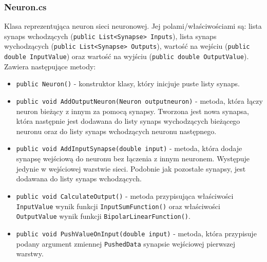 \documentclass[12pt,a4paper]{article}
\begin{document}
\subsubsection*{Neuron.cs}
\hspace{20pt} Klasa reprezentująca neuron sieci neuronowej. Jej polami/właściwościami są: lista synaps wchodzących (\lstinline{public List<Synapse> Inputs}), lista synaps wychodzących (\lstinline{public List<Synapse> Outputs}), wartość na wejściu (\lstinline{public double InputValue}) oraz wartość na wyjściu (\lstinline{public double OutputValue}). Zawiera następujące metody:
\begin{itemize}
    \item \lstinline{public Neuron()} - konstruktor klasy, który inicjuje puste listy synaps.
	\item \lstinline{public void AddOutputNeuron(Neuron outputneuron)} - metoda, która łączy neuron bieżący z innym za pomocą synapsy. Tworzona jest nowa synapsa, która następnie jest dodawana do listy synaps wychodzących bieżącego neuronu oraz do listy synaps wchodzących neuronu następnego.
	\item \lstinline{public void AddInputSynapse(double input)} - metoda, która dodaje synapsę wejściową do neuronu bez łączenia z innym neuronem. Występuje jedynie w wejściowej warstwie sieci. Podobnie jak pozostałe synapsy, jest dodawana do listy synaps wchodzących.
	\item \lstinline{public void CalculateOutput()} - metoda przypisująca właściwości \lstinline{InputValue} wynik funkcji \lstinline{InputSumFunction()} oraz właściwości \lstinline{OutputValue} wynik funkcji \lstinline{BipolarLinearFunction()}.
	\item \lstinline{public void PushValueOnInput(double input)} - metoda, która przypisuje podany argument zmiennej \lstinline{PushedData} synapsie wejściowej pierwszej warstwy. 
	\end{itemize}
\end{document}
